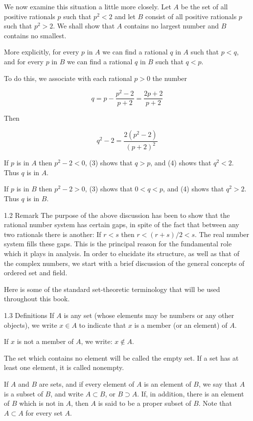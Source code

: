 \documentclass[10pt]{article}
\begin{document}
We now examine this situation a little more closely. Let $A$ be the set of all positive rationals $p$ such that $p^{2}<2$ and let $B$ consist of all positive rationals $p$ such that $p^{2}>2$. We shall show that $A$ contains no largest number and $B$ contains no smallest.

More explicitly, for every $p$ in $A$ we can find a rational $q$ in $A$ such that $p<q$, and for every $p$ in $B$ we can find a rational $q$ in $B$ such that $q<p$.

To do this, we associate with each rational $p>0$ the number

$$
q=p-\frac{p^{2}-2}{p+2}=\frac{2 p+2}{p+2}
$$

Then

$$
q^{2}-2=\frac{2\left(p^{2}-2\right)}{(p+2)^{2}}
$$

If $p$ is in $A$ then $p^{2}-2<0$, (3) shows that $q>p$, and (4) shows that $q^{2}<2$. Thus $q$ is in $A$.

If $p$ is in $B$ then $p^{2}-2>0$, (3) shows that $0<q<p$, and (4) shows that $q^{2}>2$. Thus $q$ is in $B$.

1.2 Remark The purpose of the above discussion has been to show that the rational number system has certain gaps, in spite of the fact that between any two rationals there is another: If $r<s$ then $r<(r+s) / 2<s$. The real number system fills these gaps. This is the principal reason for the fundamental role which it plays in analysis. In order to elucidate its structure, as well as that of the complex numbers, we start with a brief discussion of the general concepts of ordered set and field.

Here is some of the standard set-theoretic terminology that will be used throughout this book.

1.3 Definitions If $A$ is any set (whose elements may be numbers or any other objects), we write $x \in A$ to indicate that $x$ is a member (or an element) of $A$.

If $x$ is not a member of $A$, we write: $x \notin A$.

The set which contains no element will be called the empty set. If a set has at least one element, it is called nonempty.

If $A$ and $B$ are sets, and if every element of $A$ is an element of $B$, we say that $A$ is a subset of $B$, and write $A \subset B$, or $B \supset A$. If, in addition, there is an element of $B$ which is not in $A$, then $A$ is said to be a proper subset of $B$. Note that $A \subset A$ for every set $A$.
\end{document}
